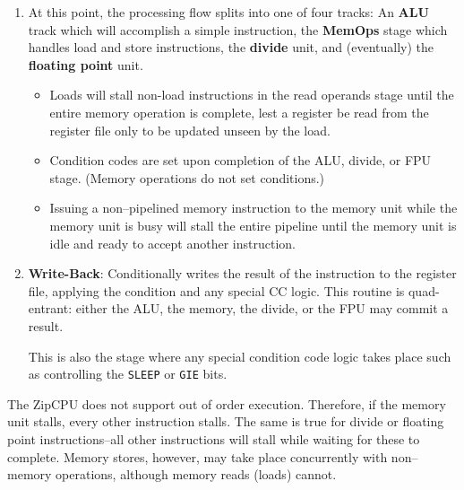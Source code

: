 \documentclass{gqtekspec}
\begin{document}
\begin{enumerate}
\item At this point, the processing flow splits into one of four tracks: An
	{\bf ALU} track which will accomplish a simple instruction, the
	{\bf MemOps} stage which handles load and store instructions, the
	{\bf divide} unit, and (eventually) the {\bf floating point} unit.
	\begin{itemize}
	\item Loads will stall non-load instructions in the read operands stage
		until the entire memory operation is complete, lest a register
		be read from the register file only to be updated unseen by the
		load.
	\item Condition codes are set upon completion of the ALU, divide,
		or FPU stage.  (Memory operations do not set conditions.)
	\item Issuing a non--pipelined memory instruction to the memory unit
		while the memory unit is busy will stall the entire pipeline
		until the memory unit is idle and ready to accept another
		instruction.
	\end{itemize}
\item {\bf Write-Back}: Conditionally writes the result of the instruction to
	the register file, applying the condition and any special CC logic.
	This routine is quad-entrant: either the ALU, the memory, the divide,
	or the FPU may commit a result.

	This is also the stage where any special condition code logic takes
	place such as controlling the {\tt SLEEP} or {\tt GIE} bits.
\end{enumerate}

The ZipCPU does not support out of order execution.  Therefore, if the memory
unit stalls, every other instruction stalls.  The same is true for divide or
floating point instructions--all other instructions will stall while waiting
for these to complete.  Memory stores, however, may take place concurrently
with non--memory operations, although memory reads (loads) cannot.

\end{document}
